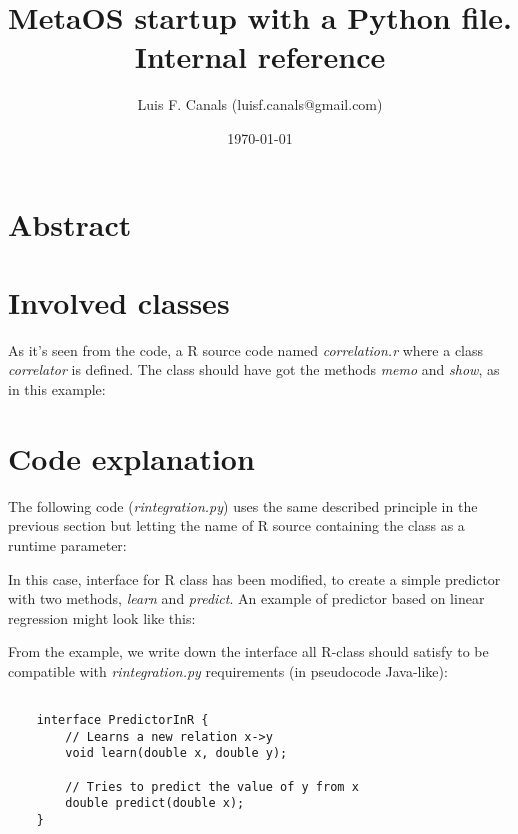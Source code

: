 \documentclass[11pt,a4paper]{article}
\title{MetaOS startup with a Python file. Internal reference}
\author{Luis F. Canals (luisf.canals@gmail.com)}
\begin{document}
\date{\today}
\maketitle


\section{Abstract}

\section{Involved classes}

\lstset{language=Java,frame=single,tabsize=2,basicstyle=\tiny}


As it's seen from the code, a R source code named \emph{correlation.r}
where a class \emph{correlator} is defined. The class should have got the
methods \emph{memo} and \emph{show}, as in this example:

\lstset{language=R,frame=single,tabsize=2,basicstyle=\tiny}




\section{Code explanation}

The following code (\emph{rintegration.py}) uses the same described principle 
in the previous section but letting the name of R source containing the 
class as a runtime parameter:

\lstset{language=Python,frame=single,tabsize=2,basicstyle=\tiny}


In this case, interface for R class has been modified, to create a simple
predictor with two methods, \emph{learn} and \emph{predict}. An example of
predictor based on linear regression might look like this:

From the example, we write down the interface all R-class should satisfy
to be compatible with \emph{rintegration.py} requirements (in pseudocode 
Java-like):

\lstset{language=Java,frame=single,tabsize=4,basicstyle=\tiny}
\begin{lstlisting}

    interface PredictorInR {
        // Learns a new relation x->y
        void learn(double x, double y);

        // Tries to predict the value of y from x
        double predict(double x);
    }

\end{lstlisting}
\label{PredictorInR}
\end{document}
